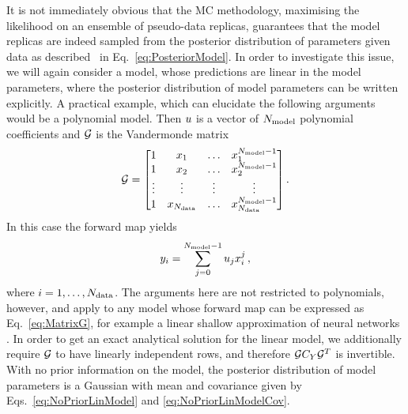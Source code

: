 It is not immediately obvious that the MC methodology, maximising the likelihood
on an ensemble of pseudo-data replicas, guarantees that the model replicas
are indeed sampled from the posterior distribution of parameters given data as
described \eg\ in Eq.~\ref{eq:PosteriorModel}. In order to investigate this
issue, we will again consider a model, whose predictions are linear in the model
parameters, where the posterior distribution of model parameters can be written
explicitly. A practical example, which can
elucidate the following arguments would be a polynomial model. Then $u$ is a
vector of $N_{\rm model}$ polynomial coefficients and $\mathcal{G}$ is the Vandermonde matrix
\begin{equation}
    \mathcal{G} =
    \begin{bmatrix}
        1  & x_1 & \ldots& x_1^{N_{\rm model}-1} \\ 
        1  & x_2 & \ldots& x_2^{N_{\rm model}-1} \\ 
        \vdots  & \vdots & \vdots& \vdots \\ 
        1  & x_{N_{\rm data}} & \ldots & x_{N_{\rm data}}^{N_{\rm model}-1} 
    \end{bmatrix}.
\end{equation}
In this case the forward map yields
    \begin{equation}
        \label{eq:PolyMod}
        y_i = \sum_{j=0}^{N_{\rm model}-1} u_j x_i^j\, , 
    \end{equation}
where $i=1,\ldots,N_{\rm data}$. The arguments here are not restricted to polynomials,
however, and apply to any model whose forward map can be expressed as
Eq.~\eqref{eq:MatrixG}, for example a linear shallow approximation of neural
networks \cite{ADVANI2020428}. In order to get an exact analytical solution for
the linear model, we additionally require $\mathcal{G}$ to have linearly independent
rows, and therefore $\mathcal{G} C_{Y} \mathcal{G}^T$ is invertible. With no
prior information on the model, the posterior distribution of model parameters
is a Gaussian with mean and covariance given by Eqs.~\ref{eq:NoPriorLinModel}
and \ref{eq:NoPriorLinModelCov}.

